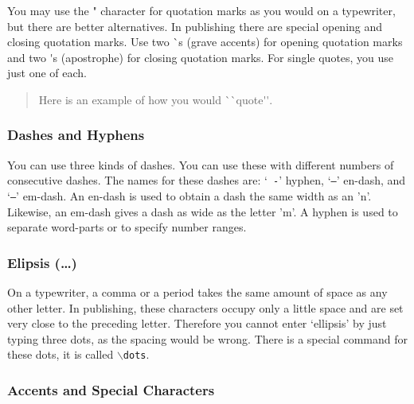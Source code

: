 \documentclass[11pt]{article}
\newcommand{\cmd}[1]{{\tt $\backslash$#1}}
\begin{document}
You may use the " character for quotation marks as you would on a
typewriter, but there are better alternatives. In publishing there are
special opening and closing quotation marks. Use two \`{}s (grave
accents) for opening quotation marks and two \'{}s (apostrophe) for
closing quotation marks. For single quotes, you use just one of each.

\begin{quote}
  Here is an example of how you would \`{}\`{}quote\'{}\'{}.
\end{quote}

\subsubsection{Dashes and Hyphens}



You can use three kinds of dashes. You can use these with different
numbers of consecutive dashes. The names for these dashes are: `{\tt
  -}' hyphen, `{\tt --}' en-dash, and `{\tt ---}' em-dash. An en-dash
is used to obtain a dash the same width as an 'n'. Likewise, an
em-dash gives a dash as wide as the letter 'm'. A hyphen is used to
separate word-parts or to specify number ranges.



\subsubsection{Elipsis (\ldots)}

On a typewriter, a comma or a period takes the same amount of space as
any other letter. In publishing, these characters occupy only a little
space and are set very close to the preceding letter. Therefore you
cannot enter `ellipsis' by just typing three dots, as the spacing
would be wrong. There is a special command for these dots, it is
called \cmd{dots}.

\subsubsection{Accents and Special Characters}
\end{document}
